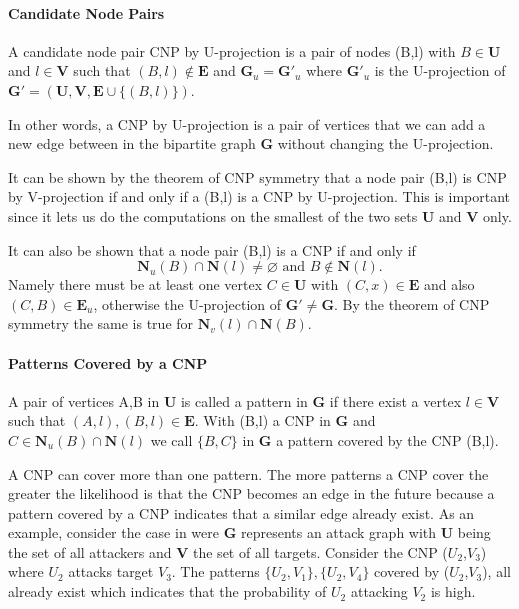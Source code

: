 \paragraph{Candidate Node Pairs}
A candidate node pair CNP by U-projection is a pair of nodes (B,l) with $B\in\textbf{U}$ and $l\in\textbf{V}$ such that $(B,l)\notin\textbf{E}$ and $\textbf{G}_u=\textbf{G}'_u$ where $\textbf{G}'_u$ is the U-projection of $\textbf{G}'=(\textbf{U},\textbf{V},\textbf{E}\cup\{(B,l)\})$.

In other words, a CNP by U-projection is a pair of vertices that we can add a new edge between in the bipartite graph $\textbf{G}$ without changing the U-projection.

It can be shown\cite{plp} by the theorem of CNP symmetry that  a node pair (B,l) is CNP by V-projection if and only if a (B,l) is a CNP by U-projection. This is important since it lets us do the computations on the smallest of the two sets $\textbf{U}$ and $\textbf{V}$ only.

It can also be shown\cite{plp} that a node pair (B,l) is a CNP if and only if 
$$
\textbf{N}_u(B)\cap\textbf{N}(l) \neq \varnothing\text{ and } B\notin \textbf{N}(l).
$$
Namely there must be at least one vertex $C\in\textbf{U}$ with $(C,x)\in\textbf{E}$ and also $(C,B)\in\textbf{E}_u$, otherwise the U-projection of $\textbf{G}'\neq\textbf{G}$. By the theorem of CNP symmetry the same is true for $\textbf{N}_v(l)\cap\textbf{N}(B)$.

\paragraph{Patterns Covered by a CNP}
A pair of vertices {A,B} in $\textbf{U}$ is called a pattern in $\textbf{G}$ if there exist a vertex $l\in\textbf{V}$ such that $(A,l),(B,l)\in\textbf{E}$. With (B,l) a CNP in $\textbf{G}$ and  $C\in\textbf{N}_u(B)\cap\textbf{N}(l)$ we call $\{B,C\}$ in $\textbf{G}$ a pattern covered by the CNP (B,l).

A CNP can cover more than one pattern. The more patterns a CNP cover the greater the likelihood is that the CNP becomes an edge in the future because a pattern covered by a CNP indicates that a similar edge already exist. As an example, consider the case in  were $\textbf{G}$ represents an attack graph with $\textbf{U}$ being the set of all attackers and $\textbf{V}$ the set of all targets. Consider the CNP ($U_2$,$V_3$) where $U_2$ attacks target $V_3$. The patterns $\{U_2,V_1\},\{U_2,V_4\}$ covered by ($U_2$,$V_3$), all already exist which indicates that the probability of $U_2$ attacking $V_2$ is high.

